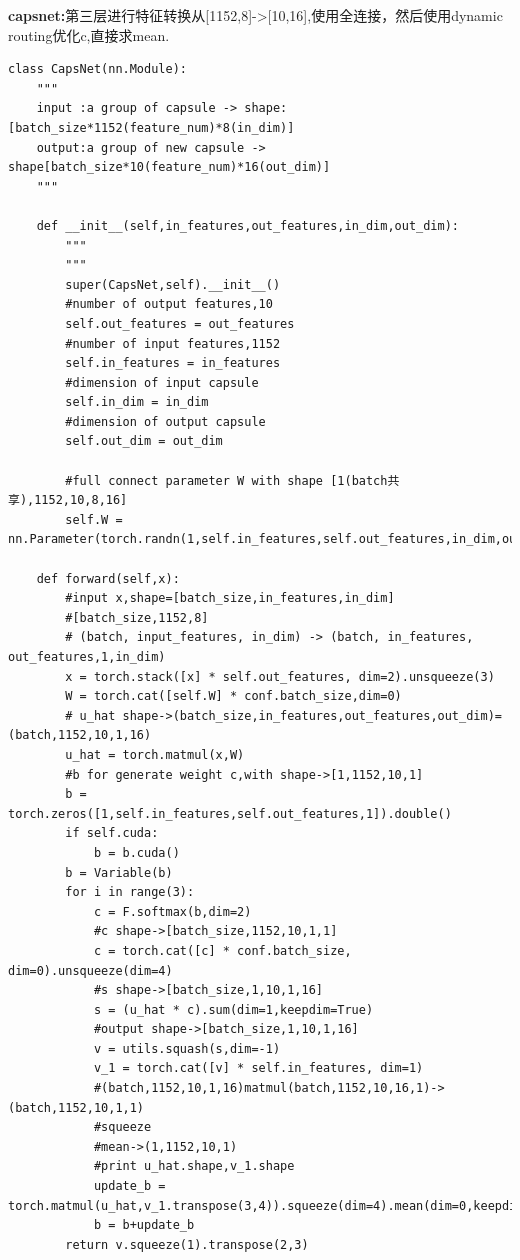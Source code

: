 \documentclass{article}
\begin{document}
\textbf{capsnet:}第三层进行特征转换从[1152,8]->[10,16],使用全连接，然后使用dynamic routing优化c,直接求mean.
\begin{lstlisting}
class CapsNet(nn.Module):
    """
    input :a group of capsule -> shape:[batch_size*1152(feature_num)*8(in_dim)]
    output:a group of new capsule -> shape[batch_size*10(feature_num)*16(out_dim)]
    """
    
    def __init__(self,in_features,out_features,in_dim,out_dim):
        """
        """
        super(CapsNet,self).__init__()
        #number of output features,10
        self.out_features = out_features
        #number of input features,1152
        self.in_features = in_features
        #dimension of input capsule
        self.in_dim = in_dim
        #dimension of output capsule
        self.out_dim = out_dim
        
        #full connect parameter W with shape [1(batch共享),1152,10,8,16]
        self.W = nn.Parameter(torch.randn(1,self.in_features,self.out_features,in_dim,out_dim))
        
    def forward(self,x):
        #input x,shape=[batch_size,in_features,in_dim]
        #[batch_size,1152,8]
        # (batch, input_features, in_dim) -> (batch, in_features, out_features,1,in_dim)
        x = torch.stack([x] * self.out_features, dim=2).unsqueeze(3)
        W = torch.cat([self.W] * conf.batch_size,dim=0)
        # u_hat shape->(batch_size,in_features,out_features,out_dim)=(batch,1152,10,1,16)
        u_hat = torch.matmul(x,W)
        #b for generate weight c,with shape->[1,1152,10,1]
        b = torch.zeros([1,self.in_features,self.out_features,1]).double()
        if self.cuda:
            b = b.cuda()
        b = Variable(b)
        for i in range(3):
            c = F.softmax(b,dim=2)
            #c shape->[batch_size,1152,10,1,1]
            c = torch.cat([c] * conf.batch_size, dim=0).unsqueeze(dim=4)
            #s shape->[batch_size,1,10,1,16]
            s = (u_hat * c).sum(dim=1,keepdim=True)
            #output shape->[batch_size,1,10,1,16]
            v = utils.squash(s,dim=-1)
            v_1 = torch.cat([v] * self.in_features, dim=1)
            #(batch,1152,10,1,16)matmul(batch,1152,10,16,1)->(batch,1152,10,1,1)
            #squeeze
            #mean->(1,1152,10,1)
            #print u_hat.shape,v_1.shape
            update_b = torch.matmul(u_hat,v_1.transpose(3,4)).squeeze(dim=4).mean(dim=0,keepdim=True)
            b = b+update_b
        return v.squeeze(1).transpose(2,3)
\end{lstlisting}
\end{document}
